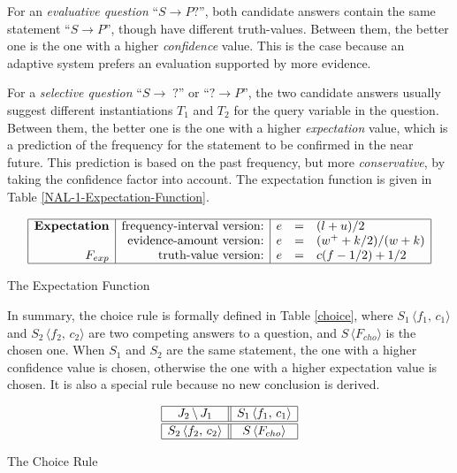For an \emph{evaluative question} ``\(S \rightarrow P ?\)'', both candidate answers contain the same statement ``\(S \rightarrow P\)'', though have different truth-values. Between them, the better one is the one with a higher \emph{confidence} value. This is the case because an adaptive system prefers an evaluation supported by more evidence.

For a \emph{selective question} ``\(S \rightarrow\; ?\)'' or ``\(? \rightarrow P\)'', the two candidate answers usually suggest different instantiations $T_1$ and $T_2$ for the query variable in the question. Between them, the better one is the one with a higher \emph{expectation} value, which is a prediction of the frequency for the statement to be confirmed in the near future. This prediction is based on the past frequency, but more \emph{conservative}, by taking the confidence factor into account. The expectation function is given in Table \ref{NAL-1-Expectation-Function}.

\begin{table}[htb]
\[\begin{array}{|r|r|lcl|} \hline
\mbox{\textbf{Expectation}} & \mbox{frequency-interval version:} & e & = & (l + u) / 2 \\
								            &	\mbox{evidence-amount version:}    & e & = & (w^+ + k/2) / (w + k) \\
                   F_{exp}  & \mbox{truth-value version:}        & e & = & c(f - 1/2) + 1/2 \\
\hline \end{array}\]
\caption{The Expectation Function}
\label{NAL-1-Expectation-Function}
\end{table}

In summary, the choice rule is formally defined in Table \ref{choice}, where $S_1 \, \langle f_1, \, c_1\rangle $ and $S_2 \, \langle f_2, \, c_2\rangle $ are two competing answers to a question, and $S \, \langle F_{cho} \rangle$ is the chosen one. When $S_1$ and $S_2$ are the same statement, the one with a higher confidence value is chosen, otherwise the one with a higher expectation value is chosen. It is also a special rule because no new conclusion is derived.

\begin{table}[htb]
\[\begin{array}{|c||c|} \hline
J_2 \, \backslash \, J_1 & S_1 \, \langle f_1, \, c_1\rangle  \\
\hline \hline
S_2 \, \langle f_2, \, c_2\rangle  & S \, \langle F_{cho}\rangle \\
\hline \end{array}\]
\caption{The Choice Rule}
\label{choice}
\end{table}


